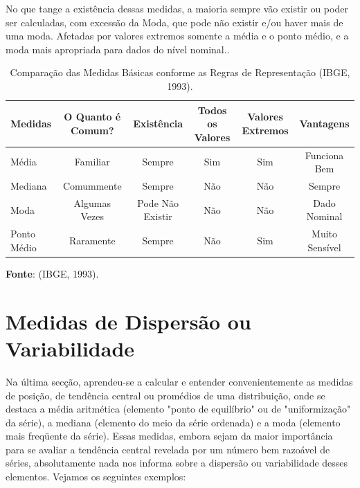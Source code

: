 \inic No que tange a existência dessas medidas, a maioria sempre vão existir ou poder ser calculadas, com excessão da Moda, que pode não existir e/ou haver mais de uma moda. Afetadas por valores extremos somente a média e o ponto médio, e a moda mais apropriada para dados do nível nominal..

\begin{table}
\centering
    {
\caption{Comparação das Medidas Básicas conforme as Regras de Representação (IBGE, 1993).}
\label{tabelarotacionada2}
    \vspace{0.2cm}
\begin{tabular}{l|c|c|c|c|c}
\hline
   Medidas  & O Quanto é Comum? & Existência        & Todos os Valores & Valores Extremos & Vantagens      \\
\hline\hline
   Média    & Familiar          & Sempre            & Sim              & Sim              & Funciona Bem    \\
   Mediana  & Comummente        & Sempre            & Não              & Não              & Sempre          \\
   Moda     & Algumas Vezes     & Pode Não Existir  & Não              & Não              & Dado Nominal    \\ 
Ponto Médio & Raramente         & Sempre            & Não              & Sim              & Muito Sensível  \\  
   \hline\hline 
\end{tabular}} 
\vspace{-0.5cm}
\textbf{Fonte}: (IBGE, 1993). 
\end{table}



\newpage
\section{Medidas de Dispersão ou Variabilidade}


Na última secção, aprendeu-se a calcular e entender convenientemente as medidas de posição, de tendência central ou promédios de uma distribuição, onde se destaca a média aritmética (elemento "ponto de equilíbrio" ou de "uniformização" da série), a mediana (elemento do meio da série ordenada) e a moda (elemento mais freqüente da série). Essas medidas, embora sejam da maior importância para se avaliar a tendência central revelada por um número bem razoável de séries, absolutamente nada nos informa sobre a dispersão ou variabilidade desses elementos.  Vejamos os seguintes exemplos:\vskip0.3cm

